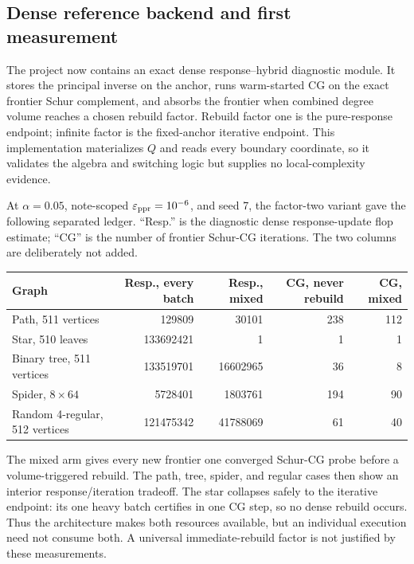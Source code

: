 \subsection{Dense reference backend and first measurement}

The project now contains an exact dense response--hybrid diagnostic module.
It stores the principal inverse on the anchor, runs warm-started CG on the
exact frontier Schur complement, and absorbs the frontier when combined degree
volume reaches a chosen rebuild factor.  Rebuild factor one is the
pure-response endpoint; infinite factor is the fixed-anchor iterative
endpoint.  This implementation materializes $Q$ and reads every boundary
coordinate, so it validates the algebra and switching logic but supplies no
local-complexity evidence.

At $\alpha=0.05$, note-scoped $\varepsilon_{\mathrm{ppr}}=10^{-6}$, and seed 7, the factor-two
variant gave the following separated ledger.  ``Resp.'' is the diagnostic
dense response-update flop estimate; ``CG'' is the number of frontier Schur-CG
iterations.  The two columns are deliberately not added.

\begin{center}
\small
\begin{tabular}{@{}lrrrr@{}}
\toprule
Graph & Resp., every batch & Resp., mixed & CG, never rebuild & CG, mixed \\
\midrule
Path, 511 vertices & 129809 & 30101 & 238 & 112 \\
Star, 510 leaves & 133692421 & 1 & 1 & 1 \\
Binary tree, 511 vertices & 133519701 & 16602965 & 36 & 8 \\
Spider, $8\times64$ & 5728401 & 1803761 & 194 & 90 \\
Random 4-regular, 512 vertices & 121475342 & 41788069 & 61 & 40 \\
\bottomrule
\end{tabular}
\end{center}

The mixed arm gives every new frontier one converged Schur-CG probe before a
volume-triggered rebuild.  The path, tree, spider, and regular cases then show
an interior response/iteration tradeoff.  The star collapses safely to the
iterative endpoint: its one heavy batch certifies in one CG step, so no dense
rebuild occurs.  Thus the architecture makes both resources available, but an
individual execution need not consume both.  A universal immediate-rebuild
factor is not justified by these measurements.
